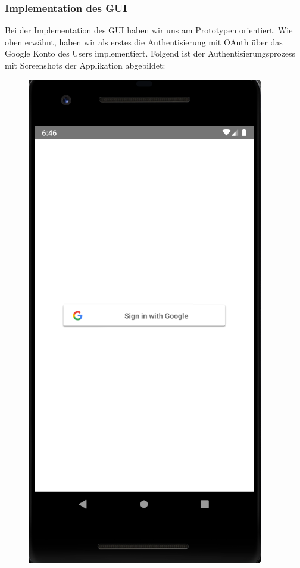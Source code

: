 \subsubsection{Implementation des GUI}
Bei der Implementation des GUI haben wir uns am Prototypen orientiert. Wie oben erwähnt, haben wir als erstes die Authentisierung mit OAuth über das Google Konto des Users implementiert. Folgend ist der Authentisierungsprozess mit Screenshots der Applikation abgebildet:

\begin{figure}[H]
  \begin{minipage}[b]{0.4\textwidth}
    \includegraphics[width=\textwidth]{images/signinwithgoogle_implementation1.PNG}

\end{minipage}
\end{figure}
